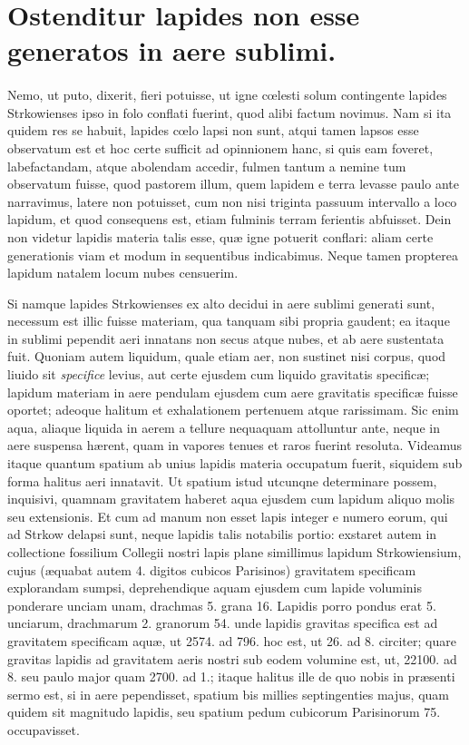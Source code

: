\documentclass[a4paper, 11pt, oneside, polutonikogreek, latin]{article}
\begin{document}
\section[Ostenditur lapides non esse generatos in aere sublimi.]{\bfseries{Ostenditur lapides non esse generatos in aere sublimi.}}
\paragraph{}
Nemo, ut puto, dixerit, fieri potuisse, ut igne cœlesti solum contingente lapides Strkowienses ipso in folo conflati fuerint, quod alibi factum novimus. Nam si ita quidem res se habuit, lapides cœlo lapsi non sunt, atqui tamen lapsos esse observatum est et hoc certe sufficit ad opinnionem hanc, si quis eam foveret, labefactandam, atque abolendam accedir, fulmen tantum a nemine tum observatum fuisse, quod pastorem illum, quem lapidem e terra levasse paulo ante narravimus, latere non potuisset, cum non nisi triginta passuum intervallo a loco lapidum, et quod consequens est, etiam fulminis terram ferientis abfuisset. Dein non videtur lapidis materia talis esse, quæ igne potuerit conflari: aliam certe generationis viam et modum in sequentibus indicabimus. Neque tamen propterea lapidum natalem locum nubes censuerim.

Si namque lapides Strkowienses ex alto decidui in aere sublimi generati sunt, necessum est illic fuisse materiam, qua tanquam sibi propria gaudent; ea itaque in sublimi pependit aeri innatans non secus atque nubes, et ab aere sustentata fuit. Quoniam autem liquidum, quale etiam aer, non sustinet nisi corpus, quod liuido sit \emph{specifice} levius, aut certe ejusdem cum liquido gravitatis specificæ; lapidum materiam in aere pendulam ejusdem cum aere gravitatis specificæ fuisse oportet; adeoque halitum et exhalationem pertenuem atque rarissimam. Sic enim aqua, aliaque liquida in aerem a tellure nequaquam attolluntur ante, neque in aere suspensa hærent, quam in vapores tenues et raros fuerint resoluta. Videamus itaque quantum spatium ab unius lapidis materia occupatum fuerit, siquidem sub forma halitus aeri innatavit. Ut spatium istud utcunqne determinare possem, inquisivi, quamnam gravitatem haberet aqua ejusdem cum lapidum aliquo molis seu extensionis. Et cum ad manum non esset lapis integer e numero eorum, qui ad Strkow delapsi sunt, neque lapidis talis notabilis portio: exstaret autem in collectione fossilium Collegii nostri lapis plane simillimus lapidum Strkowiensium, cujus (æquabat autem 4. digitos cubicos Parisinos) gravitatem specificam explorandam sumpsi, deprehendique aquam ejusdem cum lapide voluminis ponderare unciam unam, drachmas 5. grana 16. Lapidis porro pondus erat 5. unciarum, drachmarum 2. granorum 54. unde lapidis gravitas specifica est ad gravitatem specificam aquæ, ut 2574. ad 796. hoc est, ut 26. ad 8. circiter; quare gravitas lapidis ad gravitatem aeris nostri sub eodem volumine est, ut, 22100. ad 8. seu paulo major quam 2700. ad 1.; itaque halitus ille de quo nobis in præsenti sermo est, si in aere pependisset, spatium bis millies septingenties majus, quam quidem sit magnitudo lapidis, seu spatium pedum cubicorum Parisinorum 75. occupavisset.
\end{document}
